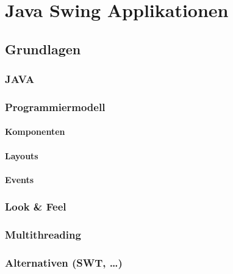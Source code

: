 \documentclass[
11pt, %
a4paper, %
BCOR25mm, %
DIV14, %
footsepline = false, %
headsepline, %
twoside, %
openright,
abstracton, %
listof=totocnumbered, %
bibliography=totocnumbered %
]{scrreprt}
\begin{document}
  
  \chapter{Java Swing Applikationen}

  \section{Grundlagen}
  
  \subsection{JAVA}
  
  \subsection{Programmiermodell}
  
  \subsubsection{Komponenten}
  
  \subsubsection{Layouts}
    
  \subsubsection{Events}
  
  \subsection{Look \& Feel}
  
  \subsection{Multithreading}
  
  \subsection{Alternativen (SWT, \ldots)}

  \cleardoublepage
   
\end{document}
